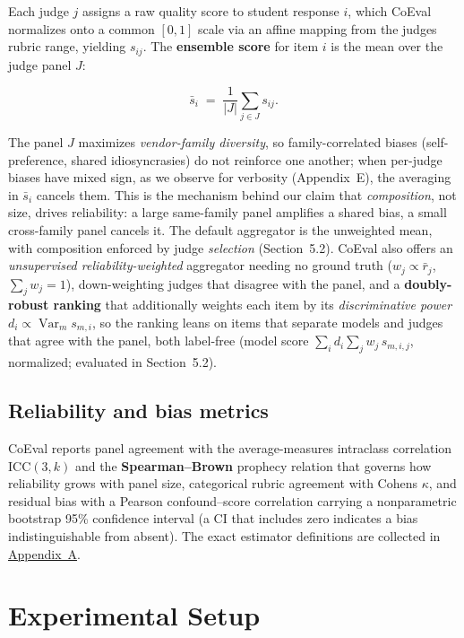 \documentclass[11pt,a4paper]{article}
\begin{document}
Each judge \(j\) assigns a raw quality score to student response \(i\), which CoEval normalizes onto a common
\([0,1]\) scale via an affine mapping from the judge\textquotesingle s rubric range, yielding \(s_{ij}\). The \textbf{ensemble score}
for item \(i\) is the mean over the judge panel \(J\):

\[\bar{s}_i \;=\; \frac{1}{|J|} \sum_{j \in J} s_{ij}.\]

The panel \(J\) maximizes \emph{vendor-family diversity}, so family-correlated biases (self-preference, shared
idiosyncrasies) do not reinforce one another; when per-judge biases have mixed sign, as we observe for verbosity
(Appendix~E), the averaging in \(\bar{s}_i\) cancels them. This is the mechanism behind our claim that
\emph{composition}, not size, drives reliability: a large same-family panel amplifies a shared bias, a small
cross-family panel cancels it. The default aggregator is the unweighted mean, with composition enforced by judge
\emph{selection} (Section~5.2). CoEval also offers an \emph{unsupervised reliability-weighted} aggregator
needing no ground truth (\(w_j \propto \bar{r}_j\), \(\sum_j w_j = 1\)), down-weighting judges that disagree with the
panel, and a \textbf{doubly-robust ranking} that additionally weights each item by its
\emph{discriminative power} \(d_i \propto \operatorname{Var}_m s_{m,i}\), so the ranking leans on items that separate
models and judges that agree with the panel, both label-free (model score \(\sum_i d_i \sum_{j} w_j\, s_{m,i,j}\),
normalized; evaluated in Section~5.2).

\subsection{Reliability and bias metrics}\label{reliability-and-bias-metrics}

CoEval reports panel agreement with the average-measures intraclass correlation \(\mathrm{ICC}(3,k)\) and the
\textbf{Spearman--Brown} prophecy relation that governs how reliability grows with panel size,
categorical rubric agreement with Cohen\textquotesingle s \(\kappa\), and residual bias with a Pearson confound--score correlation
carrying a nonparametric bootstrap 95\% confidence interval (a CI that includes zero indicates a bias indistinguishable
from absent). The exact estimator definitions are collected in \hyperref[appA]{Appendix~A}.

\section{Experimental Setup}\label{experimental-setup}
\end{document}
